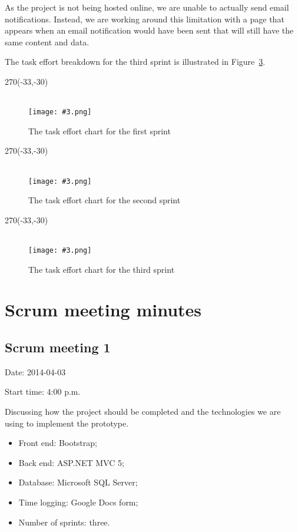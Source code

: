 \documentclass[a4paper,titlepage,12pt]{article}
\let\stdsection\section
\renewcommand\section{\newpage\stdsection}
\newcommand\figimg[4][\textwidth]{
	\begin{figure}
		\caption{#4}
		\label{fig:#2}
		\quad\\\texttt{[image: \#3.png]}
	\end{figure}
}
\begin{document}
As the project is not being hosted online, we are unable to actually send
email notifications. Instead, we are working around this limitation with a
page that appears when an email notification would have been sent that will
still have the same content and data.

The task effort breakdown for the third sprint is illustrated in
Figure~\ref{fig:effort3}.

\begin{landscape}
	\quad %
	\thispagestyle{empty}
	\begin{textblock}{270}(-33,-30)
		\figimg[280mm]{effort1}{effort1}
			{The task effort chart for the first sprint}
	\end{textblock}
\end{landscape}

\begin{landscape}
	\quad %
	\thispagestyle{empty}
	\begin{textblock}{270}(-33,-30)
		\figimg[280mm]{effort2}{effort2}
			{The task effort chart for the second sprint}
	\end{textblock}
\end{landscape}

\begin{landscape}
	\quad %
	\thispagestyle{empty}
	\begin{textblock}{270}(-33,-30)
		\figimg[280mm]{effort3}{effort3}
			{The task effort chart for the third sprint}
	\end{textblock}
\end{landscape}

\section{Scrum meeting minutes}

\subsection{Scrum meeting 1}

Date: 2014-04-03

Start time: 4:00 p.m.

Discussing how the project should be completed and the technologies we are
using to implement the prototype.

\begin{itemize}
	\item Front end: Bootstrap;
	\item Back end: ASP.NET MVC 5;
	\item Database: Microsoft SQL Server;
	\item Time logging: Google Docs form;
	\item Number of sprints: three.
\end{itemize}
\end{document}
